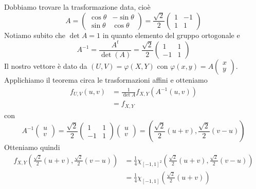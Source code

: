 \documentclass[a4paper]{article}
\begin{document}
\begin{snippetsolution}{}
    Dobbiamo trovare la trasformazione data, cioè \[
        A =
        \begin{pmatrix}
            \cos \theta & - \sin \theta \\
            \sin \theta & \cos \theta
        \end{pmatrix}
        = \frac{\sqrt 2}{2}
        \begin{pmatrix}
            1 & -1 \\ 1 & 1
        \end{pmatrix}
    \]
    Notiamo subito che \(\det A = 1\) in quanto elemento del gruppo ortogonale e
    \[
        A^{-1} = \frac{A^t}{\det (A)} = \frac{\sqrt 2}{2}
        \begin{pmatrix}
            1 & 1 \\ -1 & 1
        \end{pmatrix}
    \]
    Il nostro vettore è dato da \((U,V) = \varphi(X,Y)\)
    con \(\varphi(x,y) = A
        \begin{pmatrix}x \\ y
    \end{pmatrix}\).
    Applichiamo il teorema circa le trasformazioni affini e otteniamo
    \begin{align*}
        f_{U,V}(u,v) &= \frac{1}{\det A} f_{X,Y} (A^{-1}(u,v)) \\
        &= f_{X,Y}
    \end{align*}
    con \[
        A^{-1}
        \begin{pmatrix}u \\ v
        \end{pmatrix}
        = \frac{\sqrt 2}{2}
        \begin{pmatrix}
            1 & 1 \\ -1 & 1
        \end{pmatrix}
        \begin{pmatrix}u \\ v
        \end{pmatrix}
        = \left(
            \frac{\sqrt 2}{2}(u+v), \frac{\sqrt 2}{2}(v-u)
        \right)
    \]
    Otteniamo quindi
    \begin{align*}
        f_{X,Y}\left(
            \frac{\sqrt 2}{2}(u+v), \frac{\sqrt 2}{2}(v-u)
        \right) &= \frac{1}{4} \chi_{[-1,1]^2}\left(
            \frac{\sqrt 2}{2}(u+v), \frac{\sqrt 2}{2}(v-u)
        \right) \\
        &= \frac14 \chi_{[-1,1]}\left( \frac{\sqrt 2}{2}(u+v)\right)

\end{align*}
\end{snippetsolution}
\end{document}
